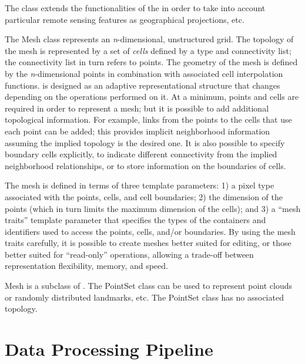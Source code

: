The  class extends the functionalities of the
 in order to take into account particular remote
sensing features as geographical projections, etc.


The Mesh class represents an \emph{n}-dimensional, unstructured grid. The
topology of the mesh is represented by a set of \emph{cells} defined by a 
type and
connectivity list; the connectivity list in turn refers to points.  The
geometry of the mesh is defined by the \emph{n}-dimensional points in
combination with associated cell interpolation functions.  is
designed as an adaptive representational structure that changes depending on
the operations performed on it. At a minimum, points and cells are required
in order to represent a mesh; but it is possible to add additional topological
information.  For example, links from the points to the cells that use each
point can be added; this provides implicit neighborhood information assuming
the implied topology is the desired one. It is also possible to
specify boundary cells explicitly, to indicate different connectivity
from the implied neighborhood relationships, or to store information
on the boundaries of cells. 

The mesh is defined in terms of three template parameters: 1) a pixel type
associated with the points, cells, and cell boundaries; 2) the dimension of
the points (which in turn limits the maximum dimension of the cells); and 3)
a ``mesh traits'' template parameter that specifies the types of the
containers and identifiers used to access the points, cells, and/or
boundaries. By using the mesh traits carefully, it is possible to create
meshes better suited for editing, or those better suited for ``read-only''
operations, allowing a trade-off between representation flexibility, memory,
and speed.

Mesh is a subclass of . The PointSet
class can be used to represent point clouds or randomly distributed
landmarks, etc. The PointSet class has no associated topology.


\section{Data Processing Pipeline}
\label{sec:DataProcessingPipeline}



